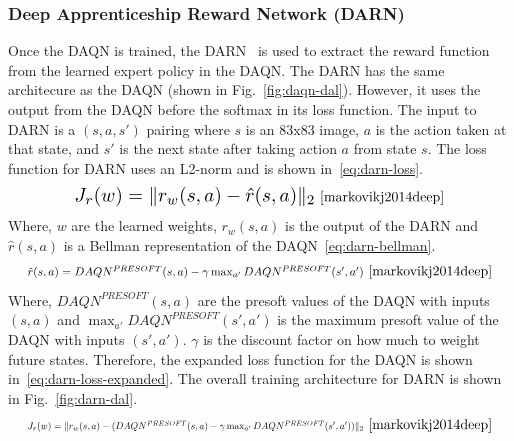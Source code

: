 \documentclass[12pt,american]{report}
\begin{document}
\subsubsection{Deep Apprenticeship Reward Network (DARN)}
Once the DAQN is trained, the DARN~\cite{markovikj2014deep} is used to extract the reward function from the learned expert policy in the DAQN.  The DARN has the same architecure as the DAQN (shown in Fig.~\ref{fig:daqn-dal}). However, it uses the output from the DAQN before the softmax in its loss function.  The input to DARN is a $(s,a,s')$ pairing where $s$ is an 83x83 image, $a$ is the action taken at that state, and $s'$ is the next state after taking action $a$ from state $s$. The loss function for DARN uses an L2-norm and is shown in~\ref{eq:darn-loss}.
\begin{equation}
     \label{eq:darn-loss}
     \resizebox{0.5\textwidth}{!}{$J_r(w) =\|r_w(s,a) - \hat{r}(s,a) \|_2$}~\cite{markovikj2014deep}%
\end{equation}
Where, $w$ are the learned weights, $r_w(s,a)$ is the output of the DARN and $\hat{r}(s,a)$ is a Bellman representation of the DAQN~\ref{eq:darn-bellman}.
\begin{equation}
     \label{eq:darn-bellman}
     \resizebox{0.7\textwidth}{!}{$\hat{r}(s,a) = DAQN^{PRESOFT}(s,a) - \gamma \max_{a'}DAQN^{PRESOFT}(s',a')$}~\cite{markovikj2014deep}%
\end{equation}
Where, $DAQN^{PRESOFT}(s,a)$ are the presoft values of the DAQN with inputs $(s,a)$ and $\max_{a'}DAQN^{PRESOFT}(s',a')$ is the maximum presoft value of the DAQN with inputs $(s',a')$. $\gamma$ is the discount factor on how much to weight future states. Therefore, the expanded loss function for the DAQN is shown in~\ref{eq:darn-loss-expanded}.  The overall training architecture for DARN is shown in Fig.~\ref{fig:darn-dal}.
\begin{equation}
     \label{eq:darn-loss-expanded}
     \resizebox{0.7\textwidth}{!}{$J_r(w) =\|r_w(s,a) - (DAQN^{PRESOFT}(s,a) - \gamma \max_{a'}DAQN^{PRESOFT}(s',a'))\|_2$}~\cite{markovikj2014deep}%
\end{equation}
\end{document}
